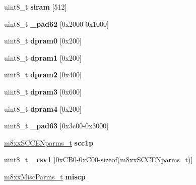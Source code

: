 \begin{DoxyCompactItemize}
\mbox{\label{structm8xx___a6f0423967c5455036a2825fc69bd60f7}} 
uint8\+\_\+t {\bfseries siram} \mbox{[}512\mbox{]}
\item 
\mbox{\label{structm8xx___a0ca5769aaac2352022bf6ede4c7c4e83}} 
uint8\+\_\+t {\bfseries \+\_\+pad62} \mbox{[}0x2000-\/0x1000\mbox{]}
\item 
\mbox{\label{structm8xx___a63b096be473f59625070d47fd31a8e09}} 
uint8\+\_\+t {\bfseries dpram0} \mbox{[}0x200\mbox{]}
\item 
\mbox{\label{structm8xx___a64c75395c021344da731bc58e7e31cd1}} 
uint8\+\_\+t {\bfseries dpram1} \mbox{[}0x200\mbox{]}
\item 
\mbox{\label{structm8xx___a59671beaa3a468f88a55f71941533945}} 
uint8\+\_\+t {\bfseries dpram2} \mbox{[}0x400\mbox{]}
\item 
\mbox{\label{structm8xx___a4b9d3e495c038caee918fa18623bd0ec}} 
uint8\+\_\+t {\bfseries dpram3} \mbox{[}0x600\mbox{]}
\item 
\mbox{\label{structm8xx___a63c20719bf6be36a3e24c18d2580a195}} 
uint8\+\_\+t {\bfseries dpram4} \mbox{[}0x200\mbox{]}
\item 
\mbox{\label{structm8xx___a5aab9ee8e458ba80f9a1c716d08ee07d}} 
uint8\+\_\+t {\bfseries \+\_\+pad63} \mbox{[}0x3c00-\/0x3000\mbox{]}
\item 
\mbox{\label{structm8xx___af01f5a27a3cc65ed7e14e089c55d23d8}} 
\mbox{\hyperlink{structm8xxSCCENparms__}{m8xx\+S\+C\+C\+E\+Nparms\+\_\+t}} {\bfseries scc1p}
\item 
\mbox{\label{structm8xx___aaadd65f5c04ae503b598ed56832568a0}} 
uint8\+\_\+t {\bfseries \+\_\+rsv1} \mbox{[}0x\+C\+B0-\/0x\+C00-\/sizeof(m8xx\+S\+C\+C\+E\+Nparms\+\_\+t)\mbox{]}
\item 
\mbox{\label{structm8xx___a1094c5558529e029a1c81d6d245c6e60}} 
\mbox{\hyperlink{structm8xxMiscParms__}{m8xx\+Misc\+Parms\+\_\+t}} {\bfseries miscp}
\item 

\end{DoxyCompactItemize}
